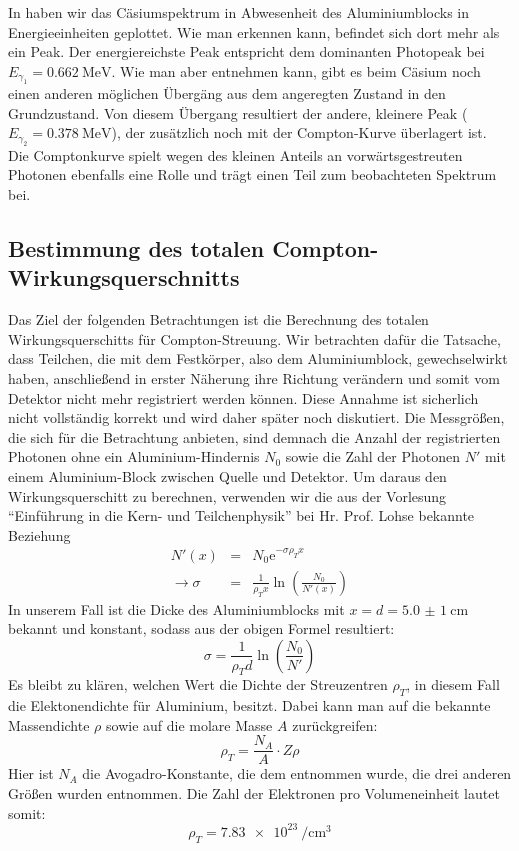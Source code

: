 In  haben wir das Cäsiumspektrum in
Abwesenheit des Aluminiumblocks in Energieeinheiten geplottet. Wie man
erkennen kann, befindet sich dort mehr als ein Peak. Der energiereichste
Peak entspricht dem dominanten Photopeak bei $E_{\gamma_1}=\SI{0,662}{\mega\eV}$.
Wie man \cite[Abb.4]{script} aber entnehmen kann, gibt es beim Cäsium noch einen
anderen möglichen Übergäng aus dem angeregten Zustand in den Grundzustand. Von diesem Übergang
resultiert der andere, kleinere Peak ($E_{\gamma_2}=\SI{0,378}{\mega\eV}$), der zusätzlich
noch mit der Compton-Kurve überlagert ist.
Die Comptonkurve spielt wegen des kleinen Anteils an vorwärtsgestreuten Photonen
ebenfalls eine Rolle und trägt einen Teil zum beobachteten Spektrum bei.

\subsection{Bestimmung des totalen Compton-Wirkungsquerschnitts}
Das Ziel der folgenden Betrachtungen ist die Berechnung des totalen
Wirkungsquerschitts für Compton-Streuung. Wir betrachten dafür die Tatsache,
dass Teilchen, die mit dem Festkörper, also dem Aluminiumblock, gewechselwirkt
haben, anschließend in erster Näherung ihre Richtung verändern und somit vom
Detektor nicht mehr registriert werden können. Diese Annahme ist sicherlich
nicht vollständig korrekt und wird daher später noch diskutiert. Die
Messgrößen, die sich für die Betrachtung anbieten, sind demnach die Anzahl der
registrierten Photonen ohne ein Aluminium-Hindernis $N_0$ sowie die Zahl der
Photonen $N'$ mit einem Aluminium-Block zwischen Quelle und Detektor. Um daraus
den Wirkungsquerschitt zu berechnen, verwenden wir die aus der Vorlesung
``Einführung in die Kern- und Teilchenphysik'' bei Hr. Prof. Lohse bekannte
Beziehung
\begin{eqnarray}
  N'(x) &=& N_0 \mathrm e^{-\sigma \rho_T x}\\
\rightarrow \sigma &=& \frac{1}{\rho_T x}\ln\left(\frac{N_0}{N'(x)}\right)
\end{eqnarray}
In unserem Fall ist die Dicke des Aluminiumblocks mit $x = d =
\SI{5,0(1)}{\centi\meter}$ bekannt und konstant, sodass aus der obigen Formel
resultiert:
\begin{equation}
  \sigma = \frac{1}{\rho_T d}\ln\left(\frac{N_0}{N'}\right)
\end{equation}
Es bleibt zu klären, welchen Wert die Dichte der Streuzentren $\rho_T$, in
diesem Fall die Elektonendichte für Aluminium, besitzt. Dabei kann man
auf die bekannte Massendichte $\rho$ sowie auf die molare Masse $A$
zurückgreifen:
\begin{equation}
  \rho_T = \frac{N_A}{A}\cdot Z\rho
\end{equation}
Hier ist $N_A$ die Avogadro-Konstante, die dem \cite{pdb} entnommen wurde, die
drei anderen Größen wurden \cite[Tab.2]{script} entnommen. Die Zahl der
Elektronen pro Volumeneinheit lautet somit:
\begin{equation}
  \rho_T = \SI{7,83e23}{\per\centi\meter\cubed}
\end{equation}

